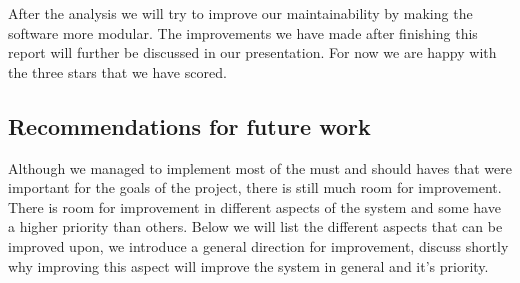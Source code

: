 After the analysis we will try to improve our maintainability by making the software more modular. 
The improvements we have made after finishing this report will further be discussed in our presentation.
For now we are happy with the three stars that we have scored.

\subsection{Recommendations for future work}
Although we managed to implement most of the must and should haves that were important for the goals of the project, there is still much room for improvement.
There is room for improvement in different aspects of the system and some have a higher priority than others.
Below we will list the different aspects that can be improved upon, we introduce a general direction for improvement, discuss shortly why improving this aspect will improve the system in general and it's priority.

